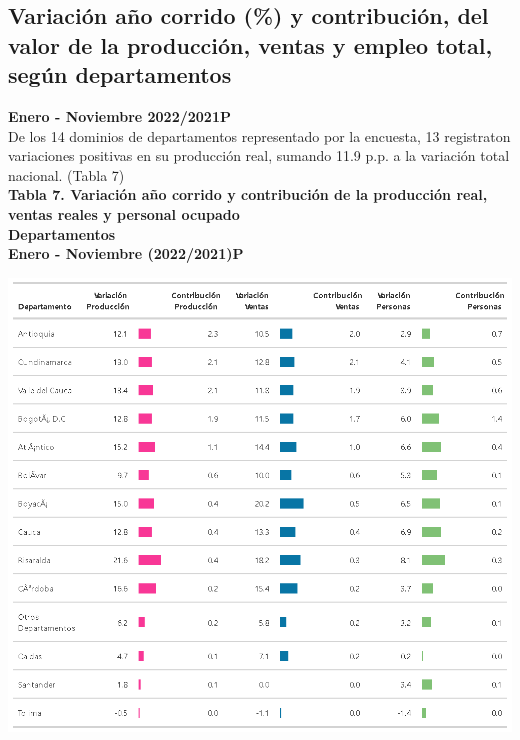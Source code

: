 \documentclass[
]{article}
\begin{document}
\hypertarget{variaciuxf3n-auxf1o-corrido-y-contribuciuxf3n-del-valor-de-la-producciuxf3n-ventas-y-empleo-total-seguxfan-departamentos}{%
\subsection{Variación año corrido (\%) y contribución, del valor de la
producción, ventas y empleo total, según
departamentos}\label{variaciuxf3n-auxf1o-corrido-y-contribuciuxf3n-del-valor-de-la-producciuxf3n-ventas-y-empleo-total-seguxfan-departamentos}}

\textbf{Enero - Noviembre 2022/2021P}\\

De los 14 dominios de departamentos representado por la encuesta, 13
registraton variaciones positivas en su producción real, sumando 11.9
p.p. a la variación total nacional. (Tabla 7)\\

\textbf{Tabla 7. Variación año corrido y contribución de la producción
real, ventas reales y personal ocupado}\\
\textbf{Departamentos}\\
\textbf{Enero - Noviembre (2022/2021)P}\\

\begin{center}\includegraphics[width=12.5in]{tabla7_1} \end{center}
\end{document}
